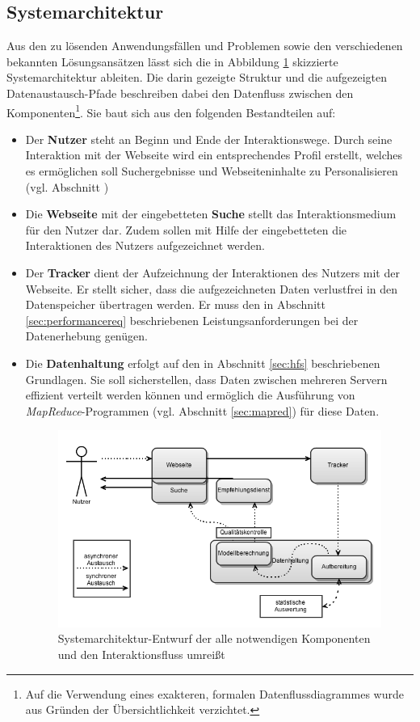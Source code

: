 \subsection{Systemarchitektur}\label{sec:system_rough}

Aus den zu lösenden Anwendungsfällen und Problemen sowie den verschiedenen bekannten Lösungsansätzen lässt sich die in Abbildung \ref{fig:system_rough} skizzierte Systemarchitektur ableiten. Die darin gezeigte Struktur und die aufgezeigten Datenaustausch-Pfade beschreiben dabei den Datenfluss zwischen den Komponenten\footnote{Auf die Verwendung eines exakteren, formalen Datenflussdiagrammes wurde aus Gründen der Übersichtlichkeit verzichtet.}. Sie baut sich aus den folgenden Bestandteilen auf:

\begin{itemize}
\item Der \textbf{Nutzer} steht an Beginn und Ende der Interaktionswege. Durch seine Interaktion mit der Webseite wird ein entsprechendes Profil erstellt, welches es ermöglichen soll Suchergebnisse und Webseiteninhalte  zu Personalisieren (vgl. Abschnitt \label{sec:userstories})
\item Die \textbf{Webseite} mit der eingebetteten \textbf{Suche} stellt das Interaktionsmedium für den Nutzer dar. Zudem sollen mit Hilfe der eingebetteten  die Interaktionen des Nutzers aufgezeichnet werden.
\item Der \textbf{Tracker} dient der Aufzeichnung der Interaktionen des Nutzers mit der Webseite. Er stellt sicher, dass die aufgezeichneten Daten verlustfrei in den Datenspeicher übertragen werden. Er muss den in Abschnitt \ref{sec:performancereq} beschriebenen Leistungsanforderungen bei der Datenerhebung genügen.
\item Die \textbf{Datenhaltung} erfolgt auf den in Abschnitt \ref{sec:hfs} beschriebenen Grundlagen. Sie soll sicherstellen, dass Daten zwischen mehreren  Servern effizient verteilt werden können und ermöglich die Ausführung von \textit{MapReduce}-Programmen (vgl. Abschnitt \ref{sec:mapred}) für diese Daten.

\begin{figure}[H]
  \centering
    \includegraphics[width=\textwidth]{Abbildungen/Systemmodell.png}
    \caption[Systenarchitektur]{\footnotesize Systemarchitektur-Entwurf der alle notwendigen Komponenten und den Interaktionsfluss umreißt}
    \label{fig:system_rough}
\end{figure}


\end{itemize}
